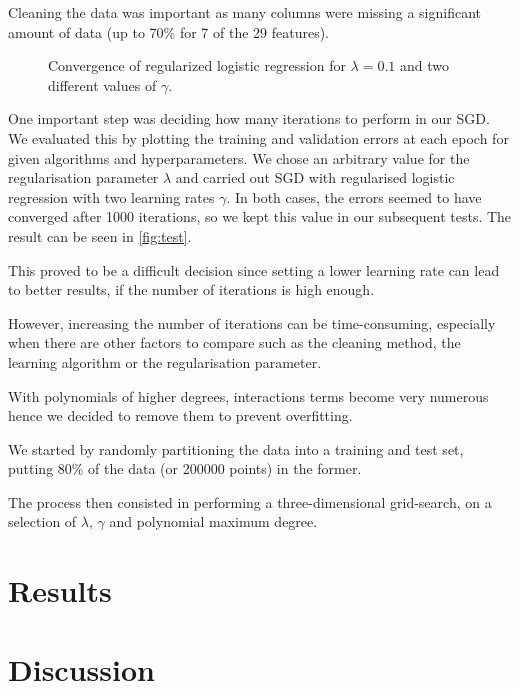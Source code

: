 \documentclass[10pt,conference,compsocconf]{IEEEtran}
\begin{document}

Cleaning the data was important as many columns were missing a significant amount of data (up to 70\% for 7 of the 29 features).

\begin{figure}
  \centering
  
  \vspace{-3mm}
  \caption{Convergence of regularized logistic regression for $\lambda = 0.1$ and two
  different values of $\gamma$.}
  \label{fig:test}
\end{figure}


One important step was deciding how many iterations to perform in our
SGD. We evaluated this by plotting the training and validation errors
at each epoch for given algorithms and hyperparameters.
We chose an arbitrary value for the regularisation parameter $\lambda$ and carried out SGD with regularised logistic regression with two learning rates $\gamma$.
In both cases, the errors seemed to have converged after 1000 iterations, so we kept this value in our subsequent tests.
The result can
be seen in \autoref{fig:test}.

This proved to be a difficult decision since setting a lower learning rate can lead to better results,
if the number of iterations is high enough.

However, increasing the number of iterations can be
time-consuming, especially when there are other
factors to compare such as the cleaning method, the learning algorithm or 
the regularisation parameter.


With polynomials of higher degrees, interactions terms become very numerous hence we decided to remove them
to prevent overfitting.


We started by randomly partitioning the data into a training and test set,
putting 80\% of the data (or 200000 points) in the former.

The process then consisted in performing a three-dimensional grid-search, on a selection of $\lambda$, $\gamma$ and polynomial maximum degree.

\section{Results}

\section{Discussion}
\end{document}
